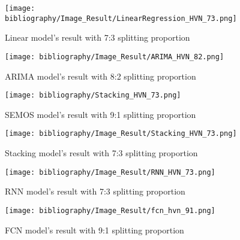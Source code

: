 \documentclass{ieeeojies}
\begin{document}
\begin{figure}[H]
  \centering
  \begin{minipage}{0.8\linewidth}
    \centering
    \texttt{[image: bibliography/Image\_Result/LinearRegression\_HVN\_73.png]}
    \caption{Linear model's result with 7:3 splitting proportion}
    \label{fig8}
  \end{minipage}
\end{figure}

\begin{figure}[H]
  \centering
  \begin{minipage}{0.8\linewidth}
    \centering
    \texttt{[image: bibliography/Image\_Result/ARIMA\_HVN\_82.png]}
    \caption{ARIMA model's result with 8:2 splitting proportion}
    \label{fig9}
  \end{minipage}
\end{figure}

\begin{figure}[H]
  \centering
  \begin{minipage}{0.8\linewidth}
    \centering
    \texttt{[image: bibliography/Stacking\_HVN\_73.png]}
    \caption{SEMOS model's result with 9:1 splitting proportion}
    \label{fig8}
  \end{minipage}
\end{figure}

\begin{figure}[H]
  \centering
  \begin{minipage}{0.8\linewidth}
    \centering
    \texttt{[image: bibliography/Image\_Result/Stacking\_HVN\_73.png]}
    \caption{Stacking model's result with 7:3 splitting proportion}
    \label{fig9}
  \end{minipage}
\end{figure}

\begin{figure}[H]
  \centering
  \begin{minipage}{0.8\linewidth}
    \centering
    \texttt{[image: bibliography/Image\_Result/RNN\_HVN\_73.png]}
    \caption{RNN model's result with 7:3 splitting proportion}
    \label{fig8}
  \end{minipage}
\end{figure}

\begin{figure}[H]
  \centering
  \begin{minipage}{0.8\linewidth}
    \centering
    \texttt{[image: bibliography/Image\_Result/fcn\_hvn\_91.png]}
    \caption{FCN model's result with 9:1 splitting proportion}
    \label{fig9}
  \end{minipage}
\end{figure}
\end{document}
